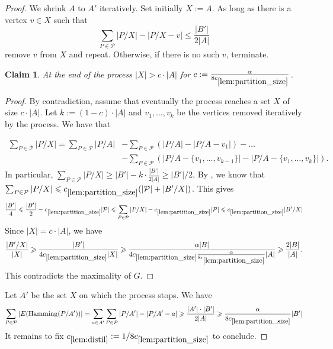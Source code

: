 \documentclass[11pt]{article}
\newtheorem{claim}{Claim}[theorem]
\theoremstyle{definition}
\newcommand{\inducedSS}[2]{#1/#2}%
\renewcommand{\leq}{\leqslant}
\renewcommand{\geq}{\geqslant}
\renewcommand{\ge}{\geqslant}
\newcommand{\Pp}{\mathcal{P}}
\newcommand{\hamming}{\mathrm{Hamming}}
\begin{document}
\begin{proof}
We shrink $A$ to $A'$ iteratively. Set initially $X := A$. As long as there is a vertex $v \in X$ such that 
\[
\sum_{P \in \Pp}|\inducedSS{P}{X}| - |\inducedSS{P}{X - v}| \leq \frac{|B'|}{2|A|}
\]
remove $v$ from $X$ and repeat. Otherwise, if there is no such $v$, terminate.
\begin{claim}
At the end of the process $|X| > c \cdot |A| $ for 
$c := \frac{\alpha}{8c_{\ref{lem:partition_size}}}$.
\end{claim}
\begin{proof}
By contradiction, assume that eventually the process reaches a set $X$ of size $c \cdot |A|$.
Let $k := (1-c) \cdot |A|$ and $v_1, \dots, v_{k}$ be the vertices removed iteratively by the process.
We have that

\begin{align*}
\sum_{P \in \Pp}|\inducedSS{P}{X}| = \sum_{P \in \Pp}|\inducedSS{P}{A}|
  &- \sum_{P \in \Pp}\left( |\inducedSS{P}{A}| - |\inducedSS{P}{A - v_1}|\right) - \dots \\
  &- \sum_{P \in \Pp}\left( |\inducedSS{P}{A - \{v_1, \dots, v_{k-1}\}}| - |\inducedSS{P}{A - \{v_1, \dots, v_{k}\}}|\right).
\end{align*}
In particular, $\sum_{P \in \Pp}|\inducedSS{P}{X}| \ge |B'| - k \cdot \frac{|B'|}{2|A|} \geq |B'|/2$.
By , we know that $\sum_{P \in \Pp}|\inducedSS{P}{X}| \leqslant c_{\ref{lem:partition_size}} (|\Pp| + |B'/X|)$.
This gives 
\[
\frac{|B'|}{4}
\leqslant
\frac{|B'|}{2} - c_{\ref{lem:partition_size}} |\Pp|
\leqslant
\sum_{P \in \Pp}|\inducedSS{P}{X}| - c_{\ref{lem:partition_size}} |\Pp|
\leqslant c_{\ref{lem:partition_size}} |B'/X|
\]
Since $|X| = c \cdot |A|$, we have
\[
\frac{|B'/X|}{|X|}
\geqslant
\frac{|B'|}{4 c_{\ref{lem:partition_size}} |X|} \geqslant
\frac{\alpha |B|}{4 c_{\ref{lem:partition_size}} \frac{\alpha}{8 c_{\ref{lem:partition_size}}} |A|} \geqslant \frac{2|B|}{|A|}.
\]
This contradicts the maximality of $G$.
\end{proof}
Let $A'$ be the set $X$ on which the process stops.
We have
\[
\sum_{P \in \Pp} |E(\hamming(\inducedSS{P}{A'}))| = \sum_{a \in A'} \sum_{P \in \Pp} |P/A'| - |P/A' - a| \geqslant \frac{|A'| \cdot |B'|}{2|A|}
\geqslant \frac{\alpha}{8 c_{\ref{lem:partition_size}}}|B'|
\]
It remains to fix $c_{\ref{lem:distil}} := 1/8c_{\ref{lem:partition_size}}$ to conclude.
\end{proof}
\end{document}
